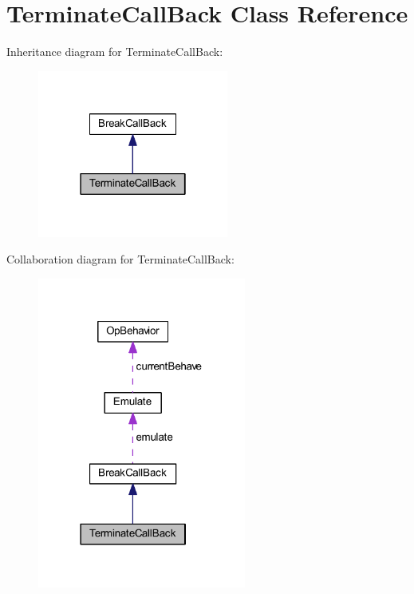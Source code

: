 \hypertarget{class_terminate_call_back}{}\section{Terminate\+Call\+Back Class Reference}
\label{class_terminate_call_back}


Inheritance diagram for Terminate\+Call\+Back\+:
\nopagebreak
\begin{figure}[H]
\begin{center}
\leavevmode
\includegraphics[width=178pt]{class_terminate_call_back__inherit__graph}
\end{center}
\end{figure}


Collaboration diagram for Terminate\+Call\+Back\+:
\nopagebreak
\begin{figure}[H]
\begin{center}
\leavevmode
\includegraphics[width=194pt]{class_terminate_call_back__coll__graph}
\end{center}
\end{figure}
